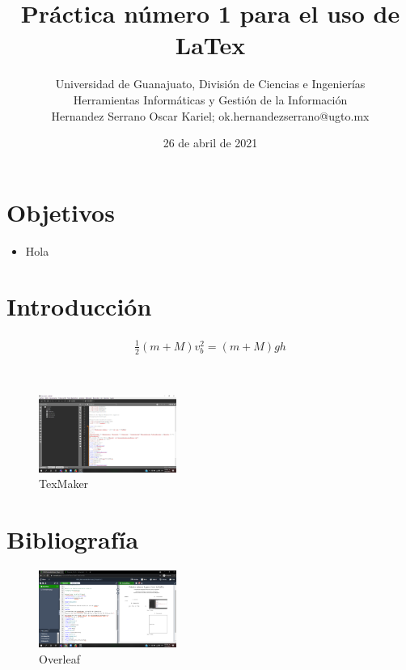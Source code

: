 \documentclass[10pt,journal]{IEEEtran}
\begin{document}
\title{Práctica número 1 para el uso de LaTex}
\author
{Universidad de Guanajuato, División de Ciencias e Ingenierías\\Herramientas Informáticas y Gestión de la Información\\
Hernandez Serrano Oscar Kariel; ok.hernandezserrano@ugto.mx\\
\date{26 de abril de 2021}
}\maketitle{}
\begin{abstract}
\end{abstract} 
\section{Objetivos}
\begin{itemize}
    \item Hola
\end{itemize}
\section{Introducción}
\begin{center}
\begin{eqnarray}
\label{eq:0}
\frac{1}{2}(m+M)v_b^2=(m+M)gh
\end{eqnarray}
\end{center}\\
\begin{figure}[h]
    \centering
    \includegraphics[width=0.4\textwidth]{Texmaker.png}
    \caption{TexMaker}
    \label{Fig. Experimento}
\end{figure}
\section{Bibliografía}
\begin{figure}[h]
    \centering
    \includegraphics[width=0.4\textwidth]{image.png}
    \caption{Overleaf}
    \label{Fig. Experimento}
\end{figure}
\end{document}
